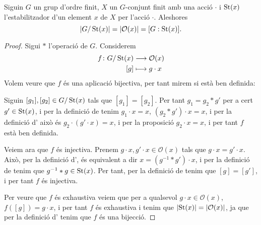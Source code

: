 \documentclass[../../Main.tex]{subfiles}
\begin{document}
	\begin{proposition}
		\label{prop:cardinal del grup dividit per cardinal de l'estabilitzador és el cardinal de l'òrbita}
		Siguin \(G\) un grup d'ordre finit, \(X\) un \(G\)-conjunt finit amb una acció \(\cdot\) i \(\operatorname{St}(x)\) l'estabilitzador d'un element \(x\) de \(X\) per l'acció \(\cdot\). Aleshores
		\[\abs{G/\St(x)}=\abs{\mathcal{O}(x)}=[G:\St(x)].\]
		\begin{proof}
			Sigui \(\ast\) l'operació de \(G\). Considerem
			\begin{align*}
			f\colon G/\operatorname{St}(x)&\longrightarrow\mathcal{O}(x)\\
			[g]&\longmapsto g\cdot x
			\end{align*}
			Volem veure que \(f\) és una aplicació bijectiva, per tant mirem si està ben definida:
			
			Siguin \([g_{1}],[g_{2}]\in G/\operatorname{St}(x)\) tals que \([g_{1}]=[g_{2}]\). Per tant \(g_{1}=g_{2}\ast g'\) per a cert \(g'\in\operatorname{St}(x)\), i per la definició de  tenim \(g_{1}\cdot x=x\), \((g_{2}\ast g')\cdot x=x\), i per la definició d' això és \(g_{2}\cdot(g'\cdot x)=x\), i per la proposició  \(g_{2}\cdot x=x\), i per tant \(f\) està ben definida.
			
			Veiem ara que \(f\) és injectiva. Prenem \(g\cdot x,g'\cdot x\in\mathcal{O}(x)\) tals que \(g\cdot x=g'\cdot x\). Això, per la definició d', és equivalent a dir \(x=(g^{-1}\ast g')\cdot x\), i per la definició de  tenim que \(g^{-1}\ast g\in\operatorname{St}(x)\). Per tant, per la definició de  tenim que \([g]=[g']\), i per tant \(f\) és injectiva.
			
			Per veure que \(f\) és exhaustiva veiem que per a qualsevol \(g\cdot x\in\mathcal{O}(x)\), \(f([g])=g\cdot x\), i per tant \(f\) és exhaustiva i tenim que \(\abs{\St(x)}=\abs{\mathcal{O}(x)}\), ja que per la definició d' tenim que \(f\) és una bijecció. %
		\end{proof}
	\end{proposition}
\end{document}
